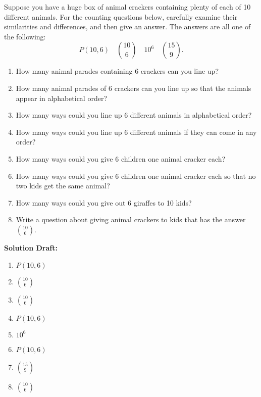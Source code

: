 \documentclass{article}
\begin{document}
Suppose you have a huge box of animal crackers containing plenty of each of 10 different animals. For the counting questions below, carefully examine their similarities and differences, and then give an answer. The answers are all one of the following:
\[
P(10,6) \quad \binom{10}{6} \quad 10^6 \quad \binom{15}{9}.
\]

\begin{enumerate}
    \item How many animal parades containing 6 crackers can you line up?
    \item How many animal parades of 6 crackers can you line up so that the animals appear in alphabetical order?
    \item How many ways could you line up 6 different animals in alphabetical order?
    \item How many ways could you line up 6 different animals if they can come in any order?
    \item How many ways could you give 6 children one animal cracker each?
    \item How many ways could you give 6 children one animal cracker each so that no two kids get the same animal?
    \item How many ways could you give out 6 giraffes to 10 kids?
    \item Write a question about giving animal crackers to kids that has the answer \(\binom{10}{6}\).
\end{enumerate}

\vspace{0.5cm}
\noindent\textbf{Solution Draft:} 
\vspace{0.2cm}

\begin{enumerate}
    \item $P(10,6)$
    \item $\binom{10}{6}$
    \item $\binom{10}{6}$
    \item $P(10,6)$
    \item $10^{6}$
    \item $P(10,6)$
    \item $\binom{15}{9}$
    \item $\binom{10}{6}$

\end{enumerate}
\end{document}
